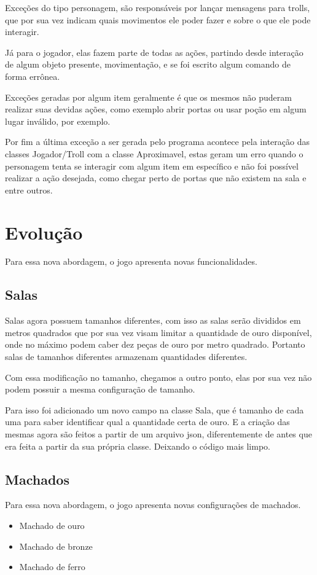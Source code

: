 \documentclass[runningheads,a4paper]{llncs}
\begin{document}
		Exceções do tipo personagem, são responsáveis por lançar mensagens para trolls, que por sua vez indicam quais movimentos ele poder fazer e sobre o que ele pode interagir. 
		
		Já para o jogador, elas fazem parte de todas as ações, partindo desde interação de algum objeto presente, movimentação, e se foi escrito algum comando de forma errônea.
		
		Exceções geradas por algum item geralmente é que os mesmos não puderam realizar suas devidas ações, como exemplo abrir portas ou usar poção em algum lugar inválido, por exemplo.
		
		Por fim a última exceção a ser gerada pelo programa acontece pela interação das classes Jogador/Troll com a classe Aproximavel, estas geram um erro quando o personagem tenta se interagir com algum item em específico e não foi possível realizar a ação desejada, como chegar perto de portas que não existem na sala e entre outros.

\section{Evolução}
	Para essa nova abordagem, o jogo apresenta novas funcionalidades.
	
	\subsection{Salas}
		Salas agora possuem tamanhos diferentes, com isso as salas serão divididos em metros quadrados que por sua vez visam limitar a quantidade de ouro disponível, onde no máximo podem caber dez peças de ouro por metro quadrado. Portanto salas de tamanhos diferentes armazenam quantidades diferentes.
		
		Com essa modificação no tamanho, chegamos a outro ponto, elas por sua vez não podem possuir a mesma configuração de tamanho.
		
		Para isso foi adicionado um novo campo na classe Sala, que é tamanho de cada uma para saber identificar qual a quantidade certa de ouro. E a criação das mesmas agora são feitos a partir de um arquivo json, diferentemente de antes que era feita a partir da sua própria classe. Deixando o código mais limpo.
		
	
	\subsection{Machados}
		Para essa nova abordagem, o jogo apresenta novas configurações de machados.
		\begin{itemize}
			\item Machado de ouro
			\item Machado de bronze
			\item Machado de ferro
		\end{itemize}
		
\end{document}
